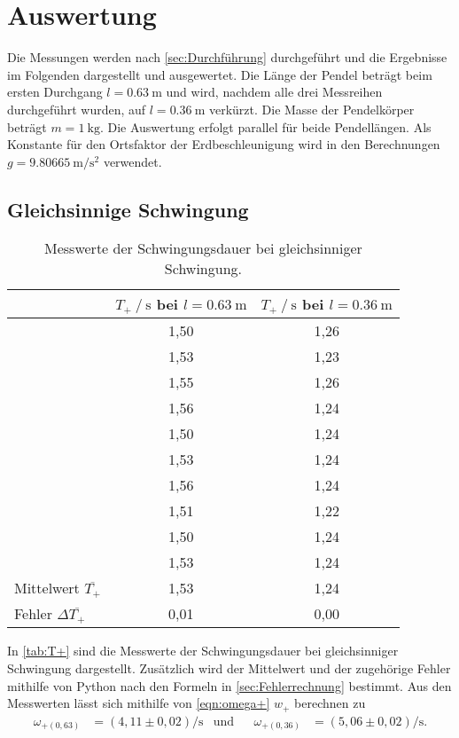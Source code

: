 \section{Auswertung}
\label{sec:Auswertung}

Die Messungen werden nach \autoref{sec:Durchführung} durchgeführt und die Ergebnisse im Folgenden dargestellt und ausgewertet.
Die Länge der Pendel beträgt beim ersten Durchgang $l=\qty{0.63}{\meter}$ und wird, nachdem alle drei Messreihen durchgeführt wurden, auf 
$l=\qty{0.36}{\meter}$ verkürzt. Die Masse der Pendelkörper beträgt $m=\qty{1}{\kilo\gram}$. 
Die Auswertung erfolgt parallel für beide Pendellängen.
Als Konstante für den Ortsfaktor der Erdbeschleunigung wird in den Berechnungen $g =\qty{9.80665}{\meter\per\second\squared}$
verwendet.

\subsection{Gleichsinnige Schwingung}
\label{subsec:aus_gleich}

\begin{table}[H]
  \centering
  \caption{Messwerte der Schwingungsdauer bei gleichsinniger Schwingung.}
  \label{tab:T+}
  \begin{tabular}{l S S}
    \toprule
     & {$T_+ \mathbin{/} \si{\second}$ bei $l=\qty{0.63}{\meter}$} & {$T_+ \mathbin{/} \si{\second}$ bei $l=\qty{0.36}{\meter}$}\\
    \midrule
      &1,50 & 1,26\\
      &1,53 & 1,23\\
      &1,55 & 1,26\\
      &1,56 & 1,24\\
      &1,50 & 1,24\\
      &1,53 & 1,24\\
      &1,56 & 1,24\\
      &1,51 & 1,22\\
      &1,50 & 1,24\\
      &1,53 & 1,24\\
    \midrule
      Mittelwert $\overline{T_+}$& 1,53 & 1,24\\
      Fehler $\Delta \overline{T_+}$& 0,01 & 0,00\\
    \bottomrule
  \end{tabular}
\end{table}
In \autoref{tab:T+} sind die Messwerte der Schwingungsdauer bei gleichsinniger Schwingung dargestellt. Zusätzlich wird der Mittelwert und der zugehörige
Fehler mithilfe von Python nach den Formeln in \autoref{sec:Fehlerrechnung} bestimmt.
Aus den Messwerten lässt sich mithilfe von \autoref{eqn:omega+} $w_+$ berechnen zu 
\begin{align*}
  \omega_{+(0,63)}&=(4,11 \pm 0,02) \si{\per\second} & \text{und} && \omega_{+(0,36)}&=(5,06 \pm 0,02) \si{\per\second}.
\end{align*}

